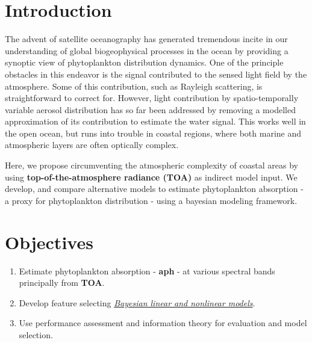 \documentclass[a0,portrait]{a0poster}
\begin{document}
\begin{multicols}{2}

\color{SaddleBrown} %

\section*{Introduction}

The advent of satellite oceanography has generated tremendous incite in our understanding of global biogeophysical processes in the ocean by providing a synoptic view of phytoplankton distribution dynamics. One of the principle obstacles in this endeavor is the signal contributed to the sensed light field by the atmosphere. Some of this contribution, such as Rayleigh scattering, is straightforward to correct for. However, light contribution by spatio-temporally  variable aerosol distribution has so far been addressed by removing a modelled approximation of its contribution to estimate the water signal. This works  well in the open ocean, but runs into trouble in coastal regions, where both marine and atmospheric layers are often optically complex. 

Here, we propose circumventing the atmospheric complexity of coastal areas by using \textbf{top-of-the-atmosphere radiance (TOA)} as indirect model input. We develop, and compare alternative models to estimate phytoplankton absorption - a proxy for phytoplankton distribution - using a bayesian modeling framework.


\color{DarkSlateGray} %

\section*{Objectives}

\begin{enumerate}
    \item Estimate phytoplankton absorption - \textbf{aph} - at various spectral bands principally from \textbf{TOA}.
    \item Develop feature selecting \underline{\emph{Bayesian linear and nonlinear models}}.
    \item Use performance assessment and information theory for evaluation and model selection.
\end{enumerate}


\end{multicols}
\end{document}
